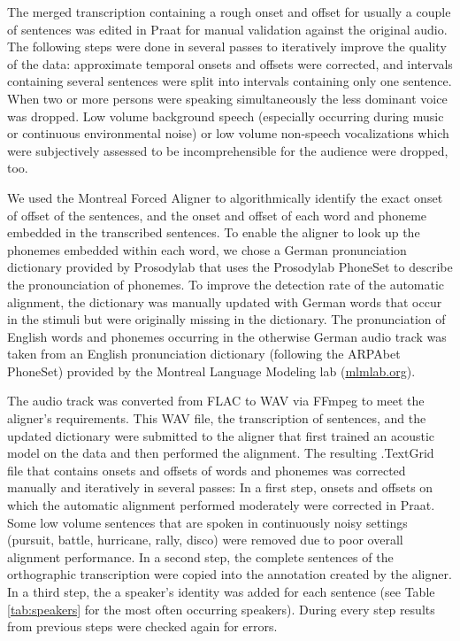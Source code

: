 \documentclass[10pt,a4paper,onecolumn]{article}
\begin{document}
The merged transcription containing a rough onset and offset for usually a couple of sentences was edited in Praat for manual validation against the original audio.
The following steps were done in several passes to iteratively improve the quality of the data:
approximate temporal onsets and offsets were corrected, and intervals containing several sentences were split into intervals containing only one sentence.
When two or more persons were speaking simultaneously the less dominant voice was dropped.
Low volume background speech (especially occurring during music or continuous environmental noise) or low volume non-speech vocalizations which were subjectively assessed to be incomprehensible for the audience were dropped, too.

We used the Montreal Forced Aligner \citep{mcauliffe2017montreal} to
algorithmically identify the exact onset of offset of the sentences, and the onset and offset of each word and phoneme embedded in the transcribed sentences.
To enable the aligner to look up the phonemes embedded within each word, we chose a German pronunciation dictionary provided by Prosodylab \citep {gorman2011prosodylab} that uses the Prosodylab PhoneSet to describe the pronounciation of phonemes.
To improve the detection rate of the automatic alignment, the dictionary was manually updated with German words that occur in the stimuli but were originally missing in the dictionary.
The pronunciation of English words and phonemes occurring in the otherwise German audio track was taken from an English pronunciation dictionary (following the ARPAbet PhoneSet) provided by the Montreal Language Modeling lab (\href{http://mlmlab.org/mfa/dictionaries/english.dict}{mlmlab.org}).

The audio track was converted from FLAC to WAV via FFmpeg \citep{ffmpeg} to meet the aligner's requirements.
This WAV file, the transcription of sentences, and the updated dictionary were
submitted to the aligner that first trained an acoustic model on the data and
then performed the alignment.
The resulting .TextGrid file that contains onsets and offsets of words and phonemes was corrected manually and iteratively in several passes:
In a first step, onsets and offsets on which the automatic alignment performed moderately were corrected in Praat.
Some low volume sentences that are spoken in continuously noisy settings (pursuit, battle, hurricane, rally, disco) were removed due to poor overall alignment performance.
In a second step, the complete sentences of the orthographic transcription were copied into the annotation created by the aligner.
In a third step, the a speaker's identity was added for each sentence (see Table \ref{tab:speakers} for the most often occurring speakers).
During every step results from previous steps were checked again for errors.
\end{document}
